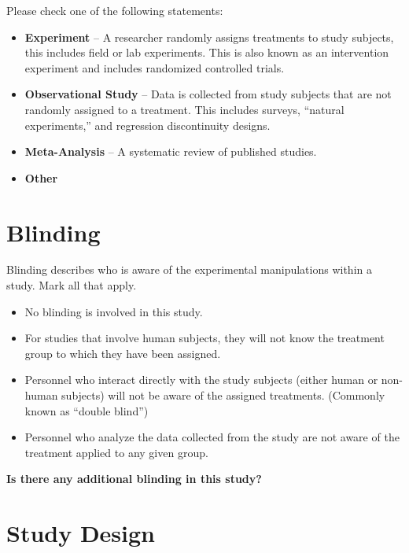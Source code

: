 \documentclass[12pt]{article}
\begin{document}
Please check one of the following statements:

\begin{itemize}
    \item[$\square$] \textbf{Experiment} -- A researcher randomly assigns treatments to study subjects, this includes field or lab experiments. This is also known as an intervention experiment and includes randomized controlled trials.
    \item[$\square$] \textbf{Observational Study} -- Data is collected from study subjects that are not randomly assigned to a treatment. This includes surveys, ``natural experiments,'' and regression discontinuity designs.
    \item[$\square$] \textbf{Meta-Analysis} -- A systematic review of published studies.
    \item[$\square$] \textbf{Other}
\end{itemize}

\section{Blinding}

Blinding describes who is aware of the experimental manipulations within a study. Mark all that apply.

\begin{itemize}
    \item[$\square$] No blinding is involved in this study.
    \item[$\square$] For studies that involve human subjects, they will not know the treatment group to which they have been assigned.
    \item[$\square$] Personnel who interact directly with the study subjects (either human or non-human subjects) will not be aware of the assigned treatments. (Commonly known as ``double blind'')
    \item[$\square$] Personnel who analyze the data collected from the study are not aware of the treatment applied to any given group.
\end{itemize}

\textbf{Is there any additional blinding in this study?}

\section{Study Design}
\end{document}
